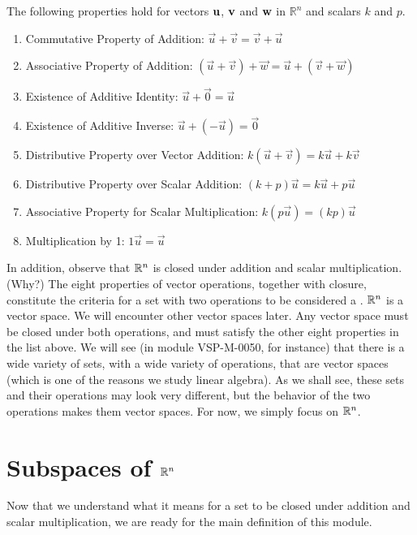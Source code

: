 \documentclass{ximera}
\begin{document}
\begin{theorem}\label{th:vecproperties} The following properties hold for vectors ${\bf u}$, ${\bf v}$ and ${\bf w}$ in $\mathbb{R}^n$ and scalars $k$ and $p$.
\begin{enumerate}
  \item 
  Commutative Property of Addition:
  $\vec{u}+\vec{v}=\vec{v}+\vec{u}$
  \item 
  Associative Property of Addition:
  $(\vec{u}+\vec{v})+\vec{w}=\vec{u}+(\vec{v}+\vec{w})$
  \item 
  Existence of Additive Identity:
  $\vec{u}+\vec{0}=\vec{u}$
  \item 
  Existence of Additive Inverse:
  $\vec{u}+(-\vec{u})=\vec{0}$
  \item
  Distributive Property over Vector Addition:
  $k(\vec{u}+\vec{v})=k\vec{u}+k\vec{v}$
  \item
  Distributive Property over Scalar Addition:
  $(k+p)\vec{u}=k\vec{u}+p\vec{u}$
  \item 
  Associative Property for Scalar Multiplication:
  $k(p\vec{u})=(kp)\vec{u}$
  \item 
  Multiplication by 1:
  $1\vec{u}=\vec{u}$
  \end{enumerate}
\end{theorem}

  
  In addition, observe that $\mathbb{R}^n$ is closed under addition and scalar multiplication.  (Why?)  The eight properties of vector operations, together with closure, constitute the criteria for a set with two operations to be considered a .  $\mathbb{R}^n$ is a vector space.  We will encounter other vector spaces later. Any vector space must be closed under both operations, and must satisfy the other eight properties in the list above.  We will see (in module VSP-M-0050, for instance) that there is a wide variety of sets, with a wide variety of operations, that are vector spaces (which is one of the reasons we study linear algebra).  As we shall see, these sets and their operations may look very different, but the behavior of the two operations makes them vector spaces.  For now, we simply focus on $\mathbb{R}^n$.


\section*{Subspaces of $\mathbb{R}^n$}

Now that we understand what it means for a set to be closed under addition and scalar multiplication, we are ready for the main definition of this module.
\end{document}
